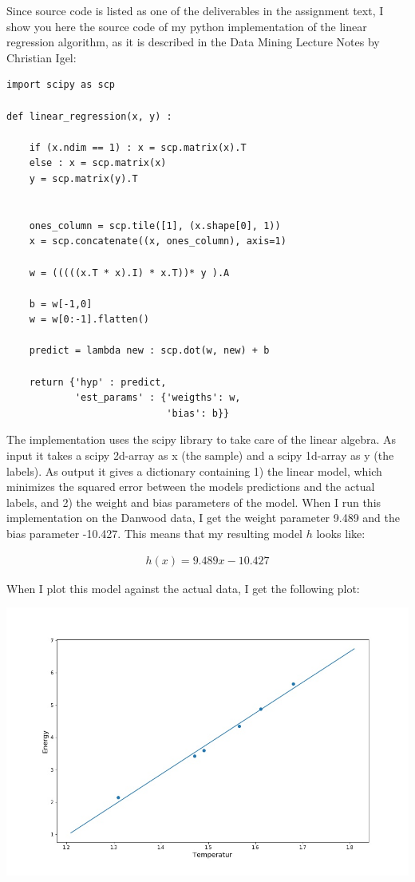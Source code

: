 Since source code is listed as one of the deliverables in the assignment text, I show you here the source code of my python implementation of the linear regression algorithm, as it is described in the Data Mining Lecture Notes by Christian Igel: 

\begin{verbatim}
import scipy as scp

def linear_regression(x, y) :
    
    if (x.ndim == 1) : x = scp.matrix(x).T
    else : x = scp.matrix(x)
    y = scp.matrix(y).T
    
    
    ones_column = scp.tile([1], (x.shape[0], 1))
    x = scp.concatenate((x, ones_column), axis=1)
    
    w = (((((x.T * x).I) * x.T))* y ).A
    
    b = w[-1,0]
    w = w[0:-1].flatten()
    
    predict = lambda new : scp.dot(w, new) + b
    
    return {'hyp' : predict, 
            'est_params' : {'weigths': w, 
                            'bias': b}}
\end{verbatim}

The implementation uses the scipy library to take care of the linear algebra. As input it takes a scipy 2d-array as x (the sample) and a scipy 1d-array as y (the labels). As output it gives a dictionary containing 1) the linear model, which minimizes the squared error between the models predictions and the actual labels, and 2) the weight and bias parameters of the model. When I run this implementation on the Danwood data, I get the weight parameter 9.489 and the bias parameter -10.427. This means that my resulting model $h$ looks like:

\begin{align}
h(x) = 9.489x - 10.427
\end{align}

When I plot this model against the actual data, I get the following plot:

\includegraphics[scale = 0.45]{linear_regression/reg_plot_1.jpg}

